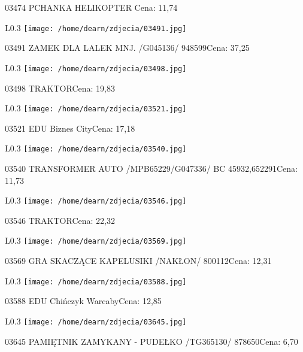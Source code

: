 03474 PCHANKA HELIKOPTER Cena: 11,74\newline
\begin{wrapfigure}{L}{0.3\textwidth}
\texttt{[image: /home/dearn/zdjecia/03491.jpg]}
\end{wrapfigure}
03491 ZAMEK DLA LALEK MNJ. /G045136/                  948599Cena: 37,25\newline
\begin{wrapfigure}{L}{0.3\textwidth}
\texttt{[image: /home/dearn/zdjecia/03498.jpg]}
\end{wrapfigure}
03498 TRAKTORCena: 19,83\newline
\begin{wrapfigure}{L}{0.3\textwidth}
\texttt{[image: /home/dearn/zdjecia/03521.jpg]}
\end{wrapfigure}
03521 EDU Biznes CityCena: 17,18\newline
\begin{wrapfigure}{L}{0.3\textwidth}
\texttt{[image: /home/dearn/zdjecia/03540.jpg]}
\end{wrapfigure}
03540 TRANSFORMER AUTO /MPB65229/G047336/   BC  45932,652291Cena: 11,73\newline
\begin{wrapfigure}{L}{0.3\textwidth}
\texttt{[image: /home/dearn/zdjecia/03546.jpg]}
\end{wrapfigure}
03546 TRAKTORCena: 22,32\newline
\begin{wrapfigure}{L}{0.3\textwidth}
\texttt{[image: /home/dearn/zdjecia/03569.jpg]}
\end{wrapfigure}
03569 GRA SKACZĄCE KAPELUSIKI /NAKŁON/                800112Cena: 12,31\newline
\begin{wrapfigure}{L}{0.3\textwidth}
\texttt{[image: /home/dearn/zdjecia/03588.jpg]}
\end{wrapfigure}
03588 EDU Chińczyk WarcabyCena: 12,85\newline
\begin{wrapfigure}{L}{0.3\textwidth}
\texttt{[image: /home/dearn/zdjecia/03645.jpg]}
\end{wrapfigure}
03645 PAMIĘTNIK ZAMYKANY - PUDEŁKO /TG365130/         878650Cena: 6,70\newline
